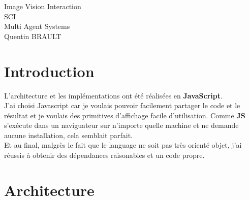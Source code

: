 \documentclass[11pt,a4paper,oneside]{report}
\begin{document}


\thispagestyle{empty}
\vspace*{1cm}
\begin{center}
{ \Huge Image Vision Interaction } \\
\vspace*{5mm}
{ \Huge SCI } \\
\vspace*{5mm}
Multi Agent Systems\\
\vspace*{5mm}
Quentin BRAULT
\end{center}


\begingroup\let\clearpage\relax
\tableofcontents \endgroup

\newpage

\section*{Introduction}
L'architecture et les implémentations ont été réalisées en \textbf{JavaScript}.\\
J'ai choisi Javascript car je voulais pouvoir facilement partager le code et le résultat et je voulais des primitives d'affichage facile d'utilisation. Comme \textbf{JS} s'exécute dans un naviguateur sur n'importe quelle machine et ne demande aucune installation, cela semblait parfait.\\
Et au final, malgrès le fait que le language ne soit pas très orienté objet, j'ai réussis à obtenir des dépendances raisonables et un code propre.

\section*{Architecture}
\end{document}
